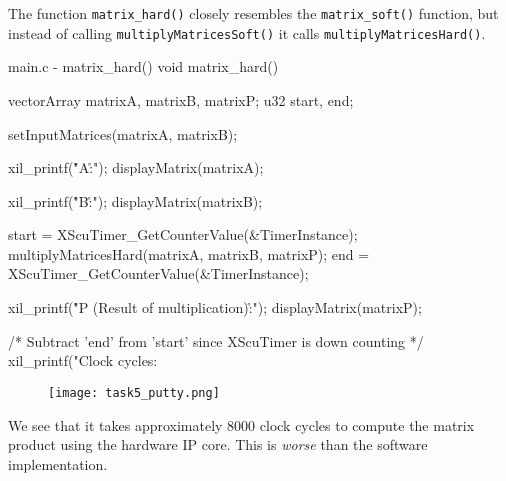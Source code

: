 \documentclass[../main.tex]{subfiles}
\begin{document}
\newpage

The function \texttt{matrix\_hard()} closely resembles the \texttt{matrix\_soft()} function, but instead of calling \texttt{multiplyMatricesSoft()} it calls \texttt{multiplyMatricesHard()}.

\begin{myminted}{main.c - matrix\_hard()}
void matrix_hard()
{
	vectorArray matrixA, matrixB, matrixP;
	u32 start, end;

	setInputMatrices(matrixA, matrixB);

	xil_printf("\r\n\nMatrix A:\r\n");
	displayMatrix(matrixA);

	xil_printf("\r\n\nMatrix B:\r\n");
	displayMatrix(matrixB);

	start = XScuTimer_GetCounterValue(&TimerInstance);
	multiplyMatricesHard(matrixA, matrixB, matrixP);
	end = XScuTimer_GetCounterValue(&TimerInstance);

	xil_printf("\r\n\nMatrix P (Result of multiplication):\r\n");
	displayMatrix(matrixP);

	/* Subtract 'end' from 'start' since XScuTimer is down counting */
	xil_printf("Clock cycles: %
}
\end{myminted}

\begin{figure}[h]
    \centering
    \texttt{[image: task5\_putty.png]}
\end{figure}

\newpage

We see that it takes approximately 8000 clock cycles to compute the matrix product using the hardware IP core. This is \textit{worse} than the software implementation. 
\end{document}
